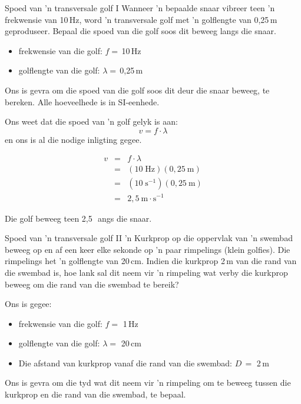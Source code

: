 \begin{definition}

\begin{wex}{Spoed van  'n transversale golf I }{Wanneer  'n bepaalde snaar vibreer teen 'n frekwensie van 10\,Hz, word  'n transversale golf met   'n 
      golflengte van 0,25\,m geproduseer. Bepaal die spoed van die golf soos dit beweeg langs
      die snaar.}
{
\begin{itemize}
\item{frekwensie van die golf: $f=$\,10\,Hz}
\item{golflengte van die golf: $\lambda=$\,0,25\,m}
\end{itemize}
Ons is gevra om die spoed van die golf soos dit deur die snaar beweeg, te bereken. Alle
      hoeveelhede is in SI-eenhede.

Ons weet dat die spoed van  'n golf gelyk is aan:
\begin{equation*}
v=f\cdot \lambda 
\end{equation*}
en ons is al die nodige inligting gegee.

\begin{eqnarray*}
v&=&f\cdot \lambda\\
&=&(10\;\text{Hz})(0,25~\text{m})\\
&=&(10\;\text{s}^{-1})(0,25~\text{m})\\
&=&2,5~\text{m} \cdot \text{s}^{-1}
\end{eqnarray*}

Die golf beweeg teen 2,5\,\ms\ angs die snaar.
}
\end{wex}


\begin{wex}{Spoed van  'n transversale golf II}{  'n Kurkprop op die oppervlak van  'n swembad beweeg op en af ​​een keer elke sekonde op
      'n paar rimpelings (klein golfies). Die rimpelings het  'n golflengte van  20\,cm. Indien die kurkprop 2\,m van die
    rand van die swembad is, hoe lank sal dit neem vir   'n rimpeling wat verby die kurkprop beweeg om die rand
    van die swembad te bereik?}{
Ons is gegee:
\begin{itemize}
\item{frekwensie van die golf: $f =$ 1\,Hz}
\item{golflengte van die golf: $\lambda =$ 20\,cm}
\item{Die afstand van kurkprop vanaf die rand van die swembad:  $D\,=$ 2\,m}
\end{itemize}
Ons is gevra om die tyd wat dit neem vir  'n rimpeling om te beweeg tussen die kurkprop
    en die rand van die swembad, te bepaal.

}
\end{wex}
\end{definition}
